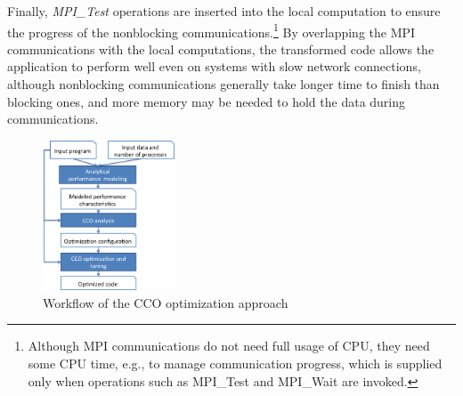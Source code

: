 Finally, \emph{MPI\_Test} operations are inserted into the local computation to
ensure the progress of the nonblocking
communications.\footnote{Although MPI communications do not need full
  usage of CPU, they need some CPU time, e.g., to manage communication
  progress, which is supplied only when operations such as MPI\_Test
  and MPI\_Wait are invoked.}  By overlapping the MPI communications
with the local computations, the transformed code allows the
application to perform well even on systems with slow network
connections, although nonblocking communications generally take longer
time to finish than blocking ones, and more memory may be needed to
hold the data during communications.

\begin{figure}[h]
\centering
\includegraphics[width=0.35\textwidth]{fig/framework.png} %
\caption{Workflow of the CCO optimization approach}
\label{fig:overview}
\end{figure}

